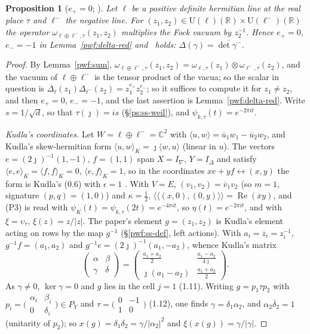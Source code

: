 \documentclass[10pt]{amsart}
\newtheorem{proposition}[theorem]{Proposition}
\theoremstyle{definition}
\theoremstyle{remark}
\newcommand{\C}{\mathbb C}
\newcommand{\R}{\mathbb R}
\providecommand{\auU}{\mathrm U}
\providecommand{\aubar}[1]{\overline{#1}}
\begin{document}
\begin{proposition}[$e_+=0$; {\cite[(30)]{P54}}]\label{pwf:eplus}
Let $\ell$ be a positive definite hermitian line at the real place $\tau$ and $\ell^-$ the negative
line. For $(z_1,z_2)\in\auU(\ell)(\R)\times\auU(\ell^-)(\R)$ the operator $\omega_{\ell\oplus\ell^-,\tau}
(z_1,z_2)$ multiplies the Fock vacuum by $z_2^{-1}$. Hence $e_+=0$, $e_-=-1$ in
Lemma~\ref{pwf:delta-red} and~{\cite[(30)]{P54}} holds: $\Delta(\gamma)=\aubar{\det\gamma^-}$.
\end{proposition}
\begin{proof}
By Lemma~\ref{pwf:sum}, $\omega_{\ell\oplus\ell^-,\tau}(z_1,z_2)=\omega_{\ell,\tau}(z_1)\otimes
\omega_{\ell^-,\tau}(z_2)$, and the vacuum of $\ell\oplus\ell^-$ is the tensor product of the vacua; so the
scalar in question is $\Delta_{\ell}(z_1)\Delta_{\ell^-}(z_2)=z_1^{e_+}z_2^{e_-}$; so it suffices to
compute it for $z_1\ne z_2$, and then $e_+=0$, $e_-=-1$, and the last assertion is
Lemma~\ref{pwf:delta-red}. Write $s=1/\sqrt d$, so that $\tau(\jmath)=is$
(\S\ref{ps:ss-weil}), and $\psi_{k,\tau}(t)=e^{-2\pi it}$.

\emph{Kudla's coordinates.} Let $W=\ell\oplus\ell^-=\C^2$ with $\langle u,w\rangle=\aubar u_1w_1-\aubar
u_2w_2$, and Kudla's skew-hermitian form $\langle u,w\rangle_K=\jmath\langle w,u\rangle$ (linear in $u$).
The vectors $e=(2\jmath)^{-1}(1,-1)$, $f=(1,1)$ span $X=I_\nabla$, $Y=I_\Delta$ and satisfy
$\langle e,e\rangle_K=\langle f,f\rangle_K=0$, $\langle e,f\rangle_K=1$, so in the coordinates
$xe+yf\leftrightarrow(x,y)$ the form is Kudla's (0.6) with $\epsilon=1$ \cite[p.~364]{KudlaSplitting}.
With $V=E$, $(v_1,v_2)=\aubar v_1v_2$ (so $m=1$, signature $(p,q)=(1,0)$) and $\kappa=\frac12$,
$\langle\!\langle(x,0),(0,y)\rangle\!\rangle=\operatorname{Re}(\aubar xy)$, and (P3) is read with
$\psi_K(t)=\psi_{k,\tau}(2t)=e^{-4\pi it}$, so $\eta(t)=e^{-2\pi it}$, and with $\xi=\upsilon_\tau$,
$\xi(z)=z/|z|$. The paper's element $g=(z_1,z_2)$ is Kudla's element acting on rows by the map
$g^{-1}$ (\S\ref{pwf:ss-def}, left actions). With $a_i=\aubar z_i=z_i^{-1}$, $g^{-1}f=(a_1,a_2)$ and
$g^{-1}e=(2\jmath)^{-1}(a_1,-a_2)$, whence Kudla's matrix
\[
\begin{pmatrix}\alpha&\beta\\\gamma&\delta\end{pmatrix}=\begin{pmatrix}\frac{a_1+a_2}2&\frac{a_1-a_2}{4\jmath}\\
\jmath(a_1-a_2)&\frac{a_1+a_2}2\end{pmatrix}.
\]
As $\gamma\ne0$, $\ker\gamma=0$ and $g$ lies in the cell $j=1$ (1.11). Writing
$g=p_1\tau p_2$ with $p_i=\bigl(\begin{smallmatrix}\alpha_i&\beta_i\\0&\delta_i\end{smallmatrix}\bigr)\in
P_Y$ and $\tau=\bigl(\begin{smallmatrix}0&-1\\1&0\end{smallmatrix}\bigr)$ (1.12), one finds
$\gamma=\delta_1\alpha_2$, and $\alpha_2\aubar\delta_2=1$ (unitarity of $p_2$); so $x(g)=\delta_1\delta_2=
\gamma/|\alpha_2|^2$ and $\xi(x(g))=\gamma/|\gamma|$.


\end{proof}
\end{document}
